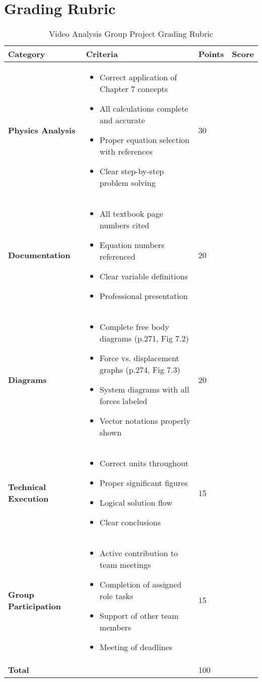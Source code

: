 \documentclass[12pt]{article}
\begin{document}
\section{Grading Rubric}
\begin{table}[h]
\centering
\begin{tabular}{|p{3cm}|p{8cm}|p{2cm}|p{2cm}|}
\hline
\textbf{Category} & \textbf{Criteria} & \textbf{Points} & \textbf{Score} \\
\hline
\textbf{Physics Analysis} & 
\begin{itemize}[leftmargin=*]
\item Correct application of Chapter 7 concepts
\item All calculations complete and accurate
\item Proper equation selection with references
\item Clear step-by-step problem solving
\end{itemize} & 30 & \\
\hline
\textbf{Documentation} & 
\begin{itemize}[leftmargin=*]
\item All textbook page numbers cited
\item Equation numbers referenced
\item Clear variable definitions
\item Professional presentation
\end{itemize} & 20 & \\
\hline
\textbf{Diagrams} & 
\begin{itemize}[leftmargin=*]
\item Complete free body diagrams (p.271, Fig 7.2)
\item Force vs. displacement graphs (p.274, Fig 7.3)
\item System diagrams with all forces labeled
\item Vector notations properly shown
\end{itemize} & 20 & \\
\hline
\textbf{Technical Execution} & 
\begin{itemize}[leftmargin=*]
\item Correct units throughout
\item Proper significant figures
\item Logical solution flow
\item Clear conclusions
\end{itemize} & 15 & \\
\hline
\textbf{Group Participation} & 
\begin{itemize}[leftmargin=*]
\item Active contribution to team meetings
\item Completion of assigned role tasks
\item Support of other team members
\item Meeting of deadlines
\end{itemize} & 15 & \\
\hline
\textbf{Total} & & 100 & \\
\hline
\end{tabular}
\caption{Video Analysis Group Project Grading Rubric}
\end{table}
\end{document}

